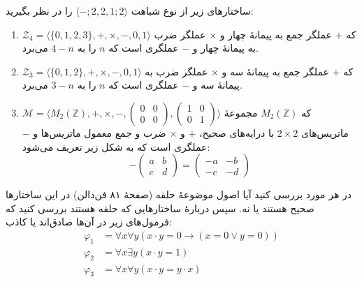 ساختارهای زیر از نوع شباهت
$\langle\mathord{-};2,2,1;2\rangle$
را در نظر بگیرید:
\begin{enumerate}[label=(\alph*)]
    \item $\mathcal{Z}_4=\langle\{0,1,2,3\},+,\times,-, 0,1\rangle$
    که $+$ عملگر جمع به پیمانهٔ چهار و
    $\times$
    عملگر ضرب به پیمانهٔ چهار و
    $-$
    عملگری است که $n$ را به $4-n$ می‌برد.
    \item $\mathcal{Z}_3=\langle\{0,1,2\},+,\times,-, 0,1\rangle$
    که $+$ عملگر جمع به پیمانهٔ سه و
    $\times$
    عملگر ضرب به پیمانهٔ سه و
    $-$
    عملگری است که $n$ را به $3-n$ می‌برد.
    \item $\mathcal{M}=\langle M_2(\mathbb{Z}),+,\times,-,
    \begin{pmatrix}
        0 & 0 \\ 0 & 0
    \end{pmatrix},
    \begin{pmatrix}
        1 & 0 \\ 0 & 1
    \end{pmatrix}
    \rangle$
    که
    $M_2(\mathbb{Z})$
    مجموعهٔ ماتریس‌های
    $2\times 2$
    با درایه‌های صحیح،
    $+$
    و
    $\times$
    ضرب و جمع معمول ماتریس‌ها و
    $-$
    عملگری است که به شکل زیر تعریف می‌شود:
    $$-\begin{pmatrix}
        a & b \\ c & d
    \end{pmatrix}
    =\begin{pmatrix}
        -a & -b \\ -c & -d
    \end{pmatrix}$$
\end{enumerate}
در هر مورد بررسی کنید آیا اصول موضوعهٔ حلقه
(صفحهٔ ۸۱ فن‌دالن)
در این ساختارها صحیح هستند یا نه. سپس دربارهٔ ساختارهایی که حلقه هستند بررسی کنید که فرمول‌های زیر در آن‌ها صادق‌اند یا کاذب:
\begin{align*}
    \varphi_1 &= \forall x \forall y (x\cdot y=0\to (x=0\vee y=0)) \\
    \varphi_2 &= \forall x \exists y (x\cdot y=1)\\
    \varphi_3 &= \forall x \forall y (x\cdot y = y\cdot x)
\end{align*}